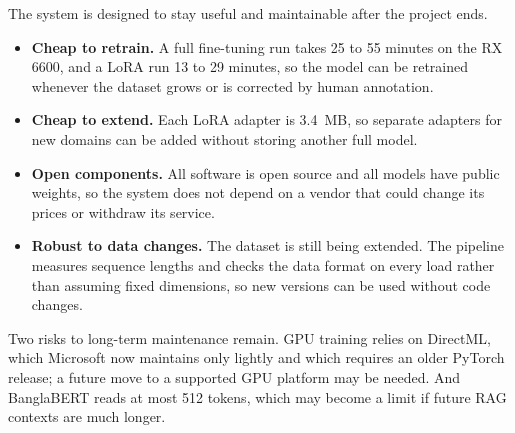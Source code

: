 The system is designed to stay useful and maintainable after the project ends.
\begin{itemize}
  \item \textbf{Cheap to retrain.} A full fine-tuning run takes 25 to 55 minutes
  on the RX 6600, and a LoRA run 13 to 29 minutes, so the model can be retrained
  whenever the dataset grows or is corrected by human annotation.
  \item \textbf{Cheap to extend.} Each LoRA adapter is 3.4~MB, so separate
  adapters for new domains can be added without storing another full model.
  \item \textbf{Open components.} All software is open source and all models
  have public weights, so the system does not depend on a vendor that could
  change its prices or withdraw its service.
  \item \textbf{Robust to data changes.} The dataset is still being extended.
  The pipeline measures sequence lengths and checks the data format on every
  load rather than assuming fixed dimensions, so new versions can be used
  without code changes.
\end{itemize}

Two risks to long-term maintenance remain. GPU training relies on DirectML,
which Microsoft now maintains only lightly and which requires an older PyTorch
release; a future move to a supported GPU platform may be needed. And
BanglaBERT reads at most 512 tokens, which may become a limit if future RAG
contexts are much longer.
